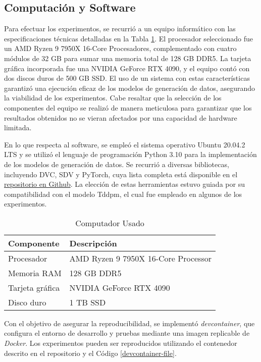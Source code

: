 \subsection{Computación y Software}
\label{subsec:computacion}
Para efectuar los experimentos, se recurrió a un equipo informático con las especificaciones técnicas detalladas en la Tabla \ref{tabla-componentes-pc}. El procesador seleccionado fue un AMD Ryzen 9 7950X 16-Core Procesadores, complementado con cuatro módulos de 32 GB para sumar una memoria total de 128 GB DDR5. La tarjeta gráfica incorporada fue una NVIDIA GeForce RTX 4090, y el equipo contó con dos discos duros de 500 GB SSD. El uso de un sistema con estas características garantizó una ejecución eficaz de los modelos de generación de datos, asegurando la viabilidad de los experimentos. Cabe resaltar que la selección de los componentes del equipo se realizó de manera meticulosa para garantizar que los resultados obtenidos no se vieran afectados por una capacidad de hardware limitada.

En lo que respecta al software, se empleó el sistema operativo Ubuntu 20.04.2 LTS y se utilizó el lenguaje de programación Python 3.10 para la implementación de los modelos de generación de datos. Se recurrió a diversas bibliotecas, incluyendo DVC, SDV y PyTorch, cuya lista completa está disponible en el \href{https://github.com/gvillarroel/synthetic-data-for-text/blob/main/freeze.txt}{repositorio en Github}. La elección de estas herramientas estuvo guiada por su compatibilidad con el modelo Tddpm, el cual fue empleado en algunos de los experimentos.


\begin{table}[H]
	\centering
	\caption{Computador Usado}
	\label{tabla-componentes-pc}
    \begin{tabular}{|l|l|}
        \hline
        \rowcolor[gray]{0.8}
        Componente & Descripción \\
        \hline
        Procesador & AMD Ryzen 9 7950X 16-Core Processor \\
        \hline
        Memoria RAM & 128 GB DDR5 \\
        \hline
        Tarjeta gráfica & NVIDIA GeForce RTX 4090 \\
        \hline
        Disco duro & 1 TB SSD \\
        \hline
      \end{tabular}        
\end{table}  

Con el objetivo de asegurar la reproducibilidad, se implementó \textit{devcontainer}, que configura el entorno de desarrollo y pruebas mediante una imagen replicable de \textit{Docker}. Los experimentos pueden ser reproducidos utilizando el contenedor descrito en el repositorio y el Código \ref{devcontainer-file}.


